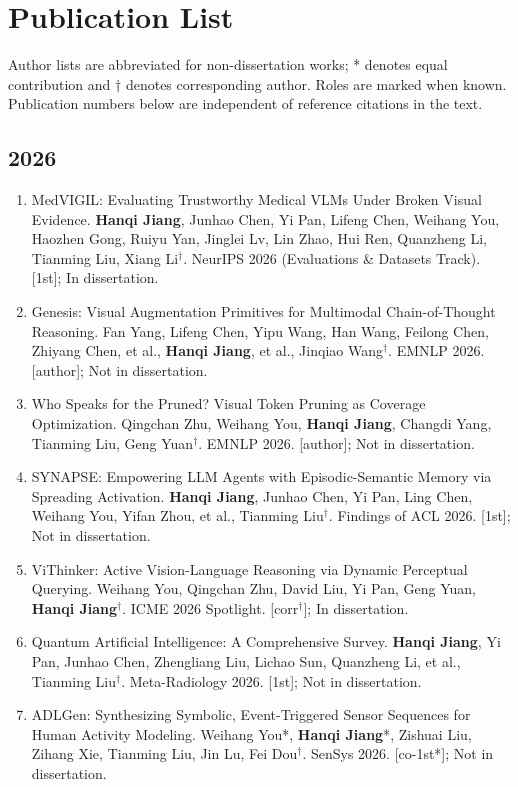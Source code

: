\section{Publication List}\label{sec:publications}
Author lists are abbreviated for non-dissertation works; * denotes equal contribution and $\dagger$ denotes corresponding author. Roles are marked when known. Publication numbers below are independent of reference citations in the text.
{\small\setlength{\parskip}{2pt}
\subsection*{2026}
\begin{enumerate}\renewcommand{\labelenumi}{[\arabic{enumi}]}\setlength{\itemsep}{2pt}\setlength{\parsep}{0pt}\setlength{\topsep}{0pt}
\setcounter{enumi}{0}
\item MedVIGIL: Evaluating Trustworthy Medical VLMs Under Broken Visual Evidence. \textbf{Hanqi Jiang}, Junhao Chen, Yi Pan, Lifeng Chen, Weihang You, Haozhen Gong, Ruiyu Yan, Jinglei Lv, Lin Zhao, Hui Ren, Quanzheng Li, Tianming Liu, Xiang Li$^{\dagger}$. NeurIPS 2026 (Evaluations \& Datasets Track). [1st]; In dissertation.
\item Genesis: Visual Augmentation Primitives for Multimodal Chain-of-Thought Reasoning. Fan Yang, Lifeng Chen, Yipu Wang, Han Wang, Feilong Chen, Zhiyang Chen, et al., \textbf{Hanqi Jiang}, et al., Jinqiao Wang$^{\dagger}$. EMNLP 2026. [author]; Not in dissertation.
\item Who Speaks for the Pruned? Visual Token Pruning as Coverage Optimization. Qingchan Zhu, Weihang You, \textbf{Hanqi Jiang}, Changdi Yang, Tianming Liu, Geng Yuan$^{\dagger}$. EMNLP 2026. [author]; Not in dissertation.
\item SYNAPSE: Empowering LLM Agents with Episodic-Semantic Memory via Spreading Activation. \textbf{Hanqi Jiang}, Junhao Chen, Yi Pan, Ling Chen, Weihang You, Yifan Zhou, et al., Tianming Liu$^{\dagger}$. Findings of ACL 2026. [1st]; Not in dissertation.
\item ViThinker: Active Vision-Language Reasoning via Dynamic Perceptual Querying. Weihang You, Qingchan Zhu, David Liu, Yi Pan, Geng Yuan, \textbf{Hanqi Jiang}$^{\dagger}$. ICME 2026 Spotlight. [corr$^{\dagger}$]; In dissertation.
\item Quantum Artificial Intelligence: A Comprehensive Survey. \textbf{Hanqi Jiang}, Yi Pan, Junhao Chen, Zhengliang Liu, Lichao Sun, Quanzheng Li, et al., Tianming Liu$^{\dagger}$. Meta-Radiology 2026. [1st]; Not in dissertation.
\item ADLGen: Synthesizing Symbolic, Event-Triggered Sensor Sequences for Human Activity Modeling. Weihang You*, \textbf{Hanqi Jiang}*, Zishuai Liu, Zihang Xie, Tianming Liu, Jin Lu, Fei Dou$^{\dagger}$. SenSys 2026. [co-1st*]; Not in dissertation.
\end{enumerate}
}
